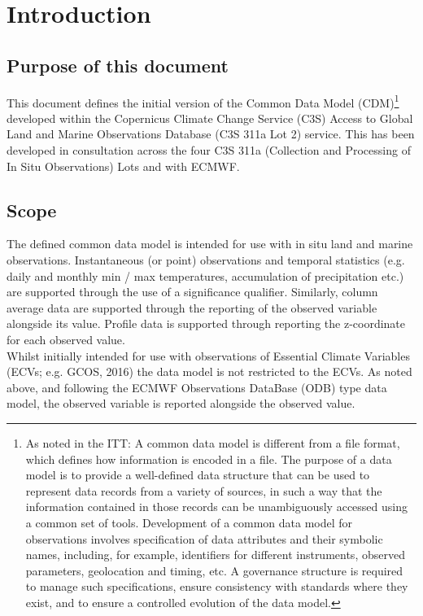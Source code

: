 \documentclass[a4paper,12pt]{article}
\begin{document}
\newpage
\tableofcontents
\newpage
\listoftables
\newpage

\section {Introduction}

\subsection {Purpose of this document}
This document defines the initial version of the Common Data Model (CDM)\footnote{As noted in the ITT: A common data model is different from a file format, which defines how information is encoded in a file. The purpose of a data model is to provide a well-defined data structure that can be used to represent data records from a variety of sources, in such a way that the information contained in those records can be unambiguously accessed using a common set of tools. Development of a common data model for observations involves specification of data attributes and their symbolic names, including, for example, identifiers for different instruments, observed parameters, geolocation and timing, etc. A governance structure is required to manage such specifications, ensure consistency with standards where they exist, and to ensure a controlled evolution of the data model.} developed within the Copernicus Climate Change Service (C3S) Access to Global Land and Marine Observations Database (C3S 311a Lot 2) service. This has been developed in consultation across the four C3S 311a (Collection and Processing of In Situ Observations) Lots and with ECMWF.

\subsection {Scope}
The defined common data model is intended for use with in situ land and marine observations. Instantaneous (or point) observations and temporal statistics (e.g. daily and monthly min / max temperatures, accumulation of precipitation etc.) are supported through the use of a significance qualifier. Similarly, column average data are supported through the reporting of the observed variable alongside its value. Profile data is supported through reporting the z-coordinate for each observed value.\\

Whilst initially intended for use with observations of Essential Climate Variables (ECVs; e.g. GCOS, 2016) the data model is not restricted to the ECVs. As noted above, and following the ECMWF Observations DataBase (ODB) type data model, the observed variable is reported alongside the observed value.\\
\end{document}
